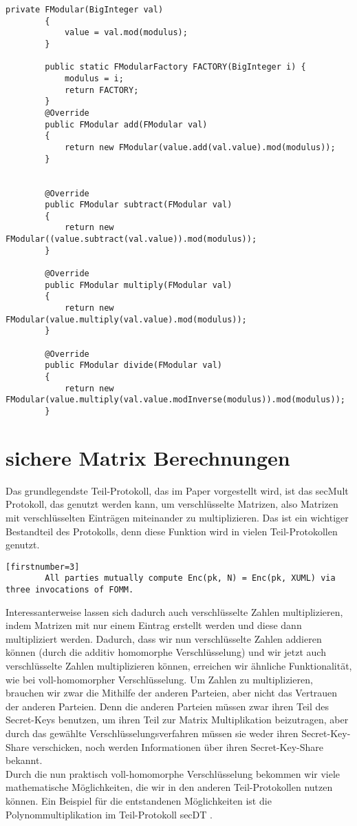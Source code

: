 \begin{lstlisting}[caption = Ausschnitt aus Teil-Protokoll secDT]
        private FModular(BigInteger val)
        {
            value = val.mod(modulus);
        }

        public static FModularFactory FACTORY(BigInteger i) {
            modulus = i;
            return FACTORY;
        }
        @Override
        public FModular add(FModular val)
        {
            return new FModular(value.add(val.value).mod(modulus));
        }
        
        
        @Override
        public FModular subtract(FModular val)
        {
            return new FModular((value.subtract(val.value)).mod(modulus));
        }

        @Override
        public FModular multiply(FModular val)
        {
            return new FModular(value.multiply(val.value).mod(modulus));
        }
        
        @Override
        public FModular divide(FModular val)
        {
            return new FModular(value.multiply(val.value.modInverse(modulus)).mod(modulus));
        }
\end{lstlisting}


\section{sichere Matrix Berechnungen}
Das grundlegendste Teil-Protokoll, das im Paper \cite{Doettling2021} vorgestellt wird, ist das secMult Protokoll, das genutzt werden kann, um verschlüsselte Matrizen, also Matrizen mit verschlüsselten Einträgen miteinander zu multiplizieren. Das ist ein wichtiger Bestandteil des Protokolls, denn diese Funktion wird in vielen Teil-Protokollen genutzt.\\
\begin{lstlisting}[caption = Ausschnitt aus dem secRank Teil-Protokoll \cite{Doettling2021}][firstnumber=3]
        All parties mutually compute Enc(pk, N) = Enc(pk, XUML) via three invocations of FOMM.
\end{lstlisting}
Interessanterweise lassen sich dadurch auch verschlüsselte Zahlen multiplizieren, indem Matrizen mit nur einem Eintrag erstellt werden und diese dann multipliziert werden. Dadurch, dass wir nun verschlüsselte Zahlen addieren können (durch die additiv homomorphe Verschlüsselung) und wir jetzt auch verschlüsselte Zahlen multiplizieren können, erreichen wir ähnliche Funktionalität, wie bei voll-homomorpher Verschlüsselung. Um Zahlen zu multiplizieren, brauchen wir zwar die Mithilfe der anderen Parteien, aber nicht das Vertrauen der anderen Parteien. Denn die anderen Parteien müssen zwar ihren Teil des Secret-Keys benutzen, um ihren Teil zur Matrix Multiplikation beizutragen, aber durch das gewählte Verschlüsselungsverfahren müssen sie weder ihren Secret-Key-Share verschicken, noch werden Informationen über ihren Secret-Key-Share bekannt.\\
Durch die nun praktisch voll-homomorphe Verschlüsselung bekommen wir viele mathematische Möglichkeiten, die wir in den anderen Teil-Protokollen nutzen können.
Ein Beispiel für die entstandenen Möglichkeiten ist die Polynommultiplikation im Teil-Protokoll secDT \cite{Doettling2021}.


